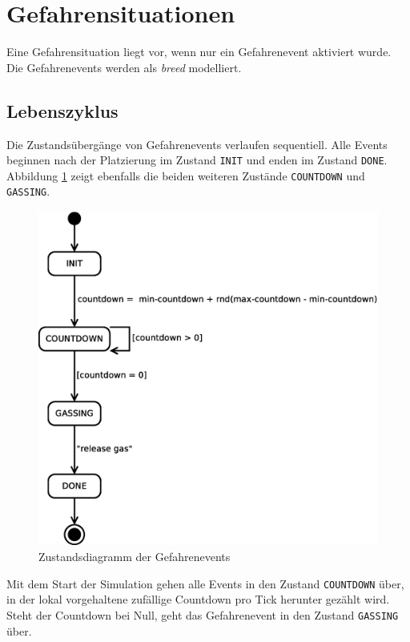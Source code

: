 
\section{Gefahrensituationen}
\label{sec:gefahrensituationen}

Eine Gefahrensituation liegt vor, wenn nur ein Gefahrenevent aktiviert wurde. Die Gefahrenevents werden als \emph{breed} modelliert. 

\subsection{Lebenszyklus}


Die Zustandsübergänge von Gefahrenevents verlaufen sequentiell. Alle Events beginnen nach der Platzierung im Zustand \verb|INIT| und enden im Zustand \verb|DONE|. Abbildung \ref{fig:event} zeigt ebenfalls die beiden weiteren Zustände \verb|COUNTDOWN| und \verb|GASSING|.

\begin{figure}[!ht]
\centering
\includegraphics[height=0.5\textwidth]{simulationsumgebung/event.eps}
\caption{Zustandsdiagramm der Gefahrenevents}
\label{fig:event}
\end{figure}

Mit dem Start der Simulation gehen alle Events in den Zustand \verb|COUNTDOWN| über, in der lokal vorgehaltene zufällige Countdown pro Tick herunter gezählt wird. Steht der Countdown bei Null, geht das Gefahrenevent in den Zustand \verb|GASSING| über.

